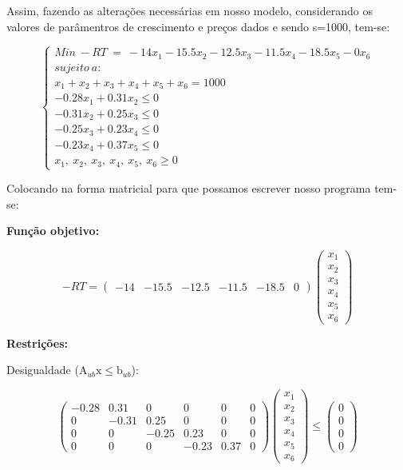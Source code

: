 \documentclass[a4paper, 12pt]{article}
\begin{document}
Assim, fazendo as alterações necessárias em nosso modelo, considerando os valores de parâmentros de crescimento e preços dados e sendo s=1000, tem-se:

\begin{equation}\label{modelo_adequado_simplex}
    \begin{cases}
Min\ -RT\ =\ -14x_1-15.5x_2-12.5x_3-11.5x_4-18.5x_5-0x_6\\
sujeito\ a:\\
x_1+x_2+x_3+x_4+x_5+x_6=1000\\
-0.28x_1+0.31x_2\le 0\\
-0.31x_2+0.25x_3\le 0\\
-0.25x_3+0.23x_4\le 0\\
-0.23x_4+0.37x_5\le 0\\
x_1{,}\ x_2{,}\ x_3{,}\ x_4{,}\ x_5{,}\ x_6\ge 0
\end{cases}
\end{equation}

Colocando na forma matricial para que possamos escrever nosso programa tem-se:

\textbf{Função objetivo:}

$$ -RT=\begin{pmatrix}
-14&-15.5&-12.5&-11.5&-18.5&0
\end{pmatrix}\begin{pmatrix}
x_1\\
x_2\\
x_3\\
x_4\\
x_5\\
x_6
\end{pmatrix} $$\newline

\textbf{Restrições:} 

Desigualdade ($\mathrm{A_{\mathit{ub}}\mathrm{x\mathit{\le \mathrm{b\mathit{_{ub}}}}}}$):

$$\begin{pmatrix}
-0.28&0.31&0&0&0&0\\
0&-0.31&0.25&0&0&0\\
0&0&-0.25&0.23&0&0\\
0&0&0&-0.23&0.37&0
\end{pmatrix}\begin{pmatrix}
x_1\\
x_2\\
x_3\\
x_4\\
x_5\\
x_6
\end{pmatrix}\le \begin{pmatrix}
0\\
0\\
0\\
0
\end{pmatrix}$$
\end{document}
